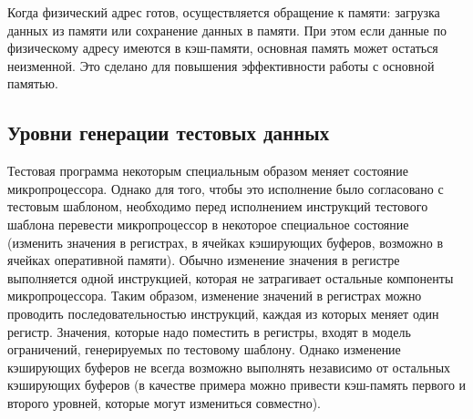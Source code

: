 Когда физический адрес готов, осуществляется обращение к памяти:
загрузка данных из памяти или сохранение данных в памяти. При этом
если данные по физическому адресу имеются в кэш-памяти, основная
память может остаться неизменной. Это сделано для повышения
эффективности работы с основной памятью.


\subsection{Уровни генерации тестовых данных}

Тестовая программа некоторым специальным образом меняет состояние
микропроцессора. Однако для того, чтобы это исполнение было
согласовано с тестовым шаблоном, необходимо перед исполнением
инструкций тестового шаблона перевести микропроцессор в некоторое
специальное состояние (изменить значения в регистрах, в ячейках
кэширующих буферов, возможно в ячейках оперативной памяти). Обычно
изменение значения в регистре выполняется одной инструкцией, которая
не затрагивает остальные компоненты микропроцессора. Таким образом,
изменение значений в регистрах можно проводить последовательностью
инструкций, каждая из которых меняет один регистр. Значения, которые
надо поместить в регистры, входят в модель ограничений, генерируемых
по тестовому шаблону. Однако изменение кэширующих буферов не всегда
возможно выполнять независимо от остальных кэширующих буферов (в
качестве примера можно привести кэш-память первого и второго
уровней, которые могут измениться совместно).

